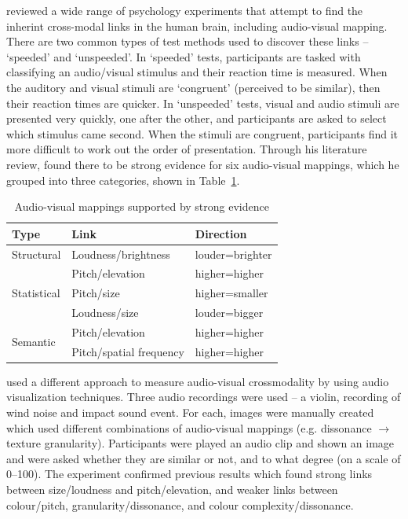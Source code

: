 \citet{Spence2011} reviewed a wide range of psychology experiments that attempt to find the inherint cross-modal links
in the human brain, including audio-visual mapping.  There are two common types of test methods used to discover these
links -- `speeded' and `unspeeded'.  In `speeded' tests, participants are tasked with classifying an audio/visual
stimulus and their reaction time is measured. When the auditory and visual stimuli are `congruent' (perceived to be
similar), then their reaction times are quicker. In `unspeeded' tests, visual and audio stimuli are presented very
quickly, one after the other, and participants are asked to select which stimulus came second. When the stimuli are
congruent, participants find it more difficult to work out the order of presentation.
Through his literature review, \citet{Spence2011} found there to be strong evidence for six audio-visual mappings,
which he grouped into three categories, shown in Table~\ref{tab:crossmodal}.

\begin{table}
\centering
\begin{tabular}{|l|l|l|}
\hline
\textbf{Type} & \textbf{Link} & \textbf{Direction} \\ \hline
Structural    & Loudness/brightness  & louder=brighter \\ \hline
\multirow{3}{*}{Statistical} & Pitch/elevation & higher=higher \\ \cline{2-3}
              & Pitch/size & higher=smaller \\ \cline{2-3}
              & Loudness/size & louder=bigger \\ \hline
\multirow{2}{*}{Semantic} & Pitch/elevation & higher=higher \\ \cline{2-3}
              & Pitch/spatial frequency & higher=higher \\ \hline
\end{tabular}
\caption{Audio-visual mappings supported by strong evidence \citep{Spence2011}}
\label{tab:crossmodal}
\end{table}

\citet{Tsiros2014} used a different approach to measure audio-visual crossmodality by using audio visualization
techniques.  Three audio recordings were used -- a violin, recording of wind noise and impact sound event. For each,
images were manually created which used different combinations of audio-visual mappings (e.g. dissonance $\to$ texture
granularity). Participants were played an audio clip and shown an image and were asked whether they are similar or not,
and to what degree (on a scale of 0--100).  The experiment confirmed previous results which found strong links between
size/loudness and pitch/elevation, and weaker links between colour/pitch, granularity/dissonance, and colour
complexity/dissonance.

